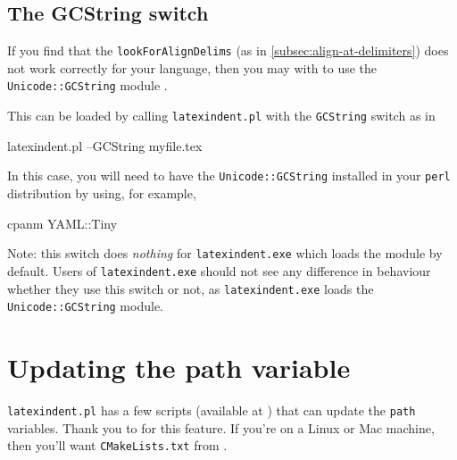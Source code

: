 	\subsection{The GCString switch}\label{subsec:the-GCString}
		If you find that the \texttt{lookForAlignDelims} (as in \cref{subsec:align-at-delimiters}) does not work correctly
		for your language, then you may with to use the \texttt{Unicode::GCString} module .

		This can be loaded by calling \texttt{latexindent.pl} with the \texttt{GCString} switch
		as in
		\begin{commandshell}
latexindent.pl --GCString myfile.tex
\end{commandshell}
		In this case, you will need to have the \texttt{Unicode::GCString} installed in your
		\texttt{perl} distribution by using, for example,
		\begin{commandshell}
cpanm YAML::Tiny
\end{commandshell}

		Note: this switch does \emph{nothing} for \texttt{latexindent.exe} which loads the module
		by default. Users of \texttt{latexindent.exe} should not see any difference in behaviour
		whether they use this switch or not, as \texttt{latexindent.exe} loads the
		\texttt{Unicode::GCString} module.

	\section{Updating the path variable}\label{sec:updating-path}
	 \texttt{latexindent.pl} has a few scripts (available at \cite{latexindent-home}) that can
	 update the \texttt{path} variables. Thank you to \cite{jasjuang} for this feature. If
	 you're on a Linux or Mac machine, then you'll want \texttt{CMakeLists.txt} from
	 \cite{latexindent-home}.
